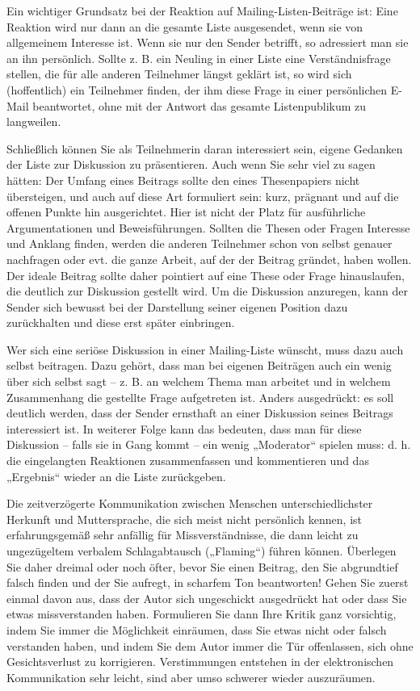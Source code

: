 \documentclass[]{book}
\theoremstyle{definition}
\theoremstyle{definition}
\theoremstyle{definition}
\theoremstyle{remark}
\begin{document}
Ein wichtiger Grundsatz bei der Reaktion auf Mailing-Listen-Beiträge
ist: Eine Reaktion wird nur dann an die gesamte Liste ausgesendet, wenn
sie von allgemeinem Interesse ist. Wenn sie nur den Sender betrifft, so
adressiert man sie an ihn persönlich. Sollte z. B. ein Neuling in einer
Liste eine Verständnisfrage stellen, die für alle anderen Teilnehmer
längst geklärt ist, so wird sich (hoffentlich) ein Teilnehmer finden,
der ihm diese Frage in einer persönlichen E-Mail beantwortet, ohne mit
der Antwort das gesamte Listenpublikum zu langweilen.

Schließlich können Sie als Teilnehmerin daran interessiert sein, eigene
Gedanken der Liste zur Diskussion zu präsentieren. Auch wenn Sie sehr
viel zu sagen hätten: Der Umfang eines Beitrags sollte den eines
Thesenpapiers nicht übersteigen, und auch auf diese Art formuliert sein:
kurz, prägnant und auf die offenen Punkte hin ausgerichtet. Hier ist
nicht der Platz für ausführliche Argumentationen und Beweisführungen.
Sollten die Thesen oder Fragen Interesse und Anklang finden, werden die
anderen Teilnehmer schon von selbst genauer nachfragen oder evt. die
ganze Arbeit, auf der der Beitrag gründet, haben wollen. Der ideale
Beitrag sollte daher pointiert auf eine These oder Frage hinauslaufen,
die deutlich zur Diskussion gestellt wird. Um die Diskussion anzuregen,
kann der Sender sich bewusst bei der Darstellung seiner eigenen Position
dazu zurückhalten und diese erst später einbringen.

Wer sich eine seriöse Diskussion in einer Mailing-Liste wünscht, muss
dazu auch selbst beitragen. Dazu gehört, dass man bei eigenen Beiträgen
auch ein wenig über sich selbst sagt -- z. B. an welchem Thema man
arbeitet und in welchem Zusammenhang die gestellte Frage aufgetreten
ist. Anders ausgedrückt: es soll deutlich werden, dass der Sender
ernsthaft an einer Diskussion seines Beitrags interessiert ist. In
weiterer Folge kann das bedeuten, dass man für diese Diskussion -- falls
sie in Gang kommt -- ein wenig „Moderator`` spielen muss: d. h. die
eingelangten Reaktionen zusammenfassen und kommentieren und das
„Ergebnis`` wieder an die Liste zurückgeben.

Die zeitverzögerte Kommunikation zwischen Menschen unterschiedlichster
Herkunft und Muttersprache, die sich meist nicht persönlich kennen, ist
erfahrungsgemäß sehr anfällig für Missverständnisse, die dann leicht zu
ungezügeltem verbalem Schlagabtausch („Flaming``) führen können.
Überlegen Sie daher dreimal oder noch öfter, bevor Sie einen Beitrag,
den Sie abgrundtief falsch finden und der Sie aufregt, in scharfem Ton
beantworten! Gehen Sie zuerst einmal davon aus, dass der Autor sich
ungeschickt ausgedrückt hat oder dass Sie etwas missverstanden haben.
Formulieren Sie dann Ihre Kritik ganz vorsichtig, indem Sie immer die
Möglichkeit einräumen, dass Sie etwas nicht oder falsch verstanden
haben, und indem Sie dem Autor immer die Tür offenlassen, sich ohne
Gesichtsverlust zu korrigieren. Verstimmungen entstehen in der
elektronischen Kommunikation sehr leicht, sind aber umso schwerer wieder
auszuräumen.
\end{document}

